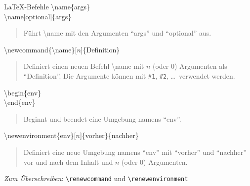 \documentclass[aspectratio=169]{beamer}
\newcommand\citestyle[1]{\textcolor{foreground-secondary}{\textsuperscript{#1}}}
\let\oldcite=\cite
\renewcommand{\cite}[1]{\citestyle{\oldcite{#1}}}
\let\oldautocite\autocite
\renewcommand{\autocite}[1]{\citestyle{\oldautocite{#1}}}
\begin{document}
    \begin{frame}[fragile]{\LaTeX-Befehle}
    \protect\hypertarget{befehle}{}
    \bgroup 
        \alert{\ttfamily \textbackslash name\{args\} \\ \textbackslash name[optional]\{args\}}
        \begin{quote}\upshape

        Führt \textbackslash name mit den Argumenten \enquote{\ttfamily args} und \enquote{\ttfamily optional} aus.\cite{latex}

        \end{quote}
    \egroup

    \bgroup 
        \alert{\ttfamily \textbackslash newcommand\{\textbackslash name\}[$n$]\{Definition\}}
        \begin{quote}\upshape

        Definiert einen neuen Befehl \textbackslash name mit $n$ (oder 0) Argumenten als \enquote{\ttfamily Definition}.
        Die Argumente können mit \texttt{\#1}, \texttt{\#2}, \ldots\ verwendet werden.\cite{latex}

        \end{quote}
    \egroup

    \bgroup 
        \alert{\ttfamily \textbackslash begin\{env\} \\ \textbackslash end\{env\}}
        \begin{quote}\upshape

        Beginnt und beendet eine Umgebung namens \enquote{\ttfamily env}.\cite{latex}

        \end{quote}
    \egroup

    \bgroup 
        \alert{\ttfamily \textbackslash newenvironment\{env\}[$n$]\{vorher\}\{nachher\}}
        \begin{quote}\upshape

        Definiert eine neue Umgebung namens \enquote{\ttfamily env} mit \enquote{\ttfamily vorher} und \enquote{\ttfamily nachher} vor und nach dem Inhalt und $n$ (oder 0) Argumenten.\cite{latex}

        \end{quote}
    \egroup

    \emph{Zum Überschreiben}: \texttt{\textbackslash{}renewcommand} und
    \texttt{\textbackslash{}renewenvironment}\autocite{latex}
    \end{frame}
\end{document}
